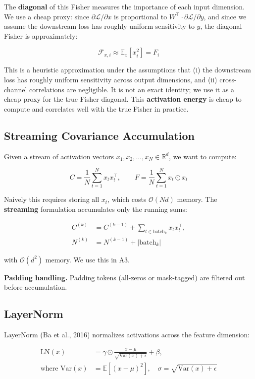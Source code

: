 The \textbf{diagonal} of this Fisher measures the importance of each input 
dimension. We use a cheap proxy: since $\partial \mathcal{L} / \partial x$ is 
proportional to $W^\top \cdot \partial \mathcal{L} / \partial y$, and since 
we assume the downstream loss has roughly uniform sensitivity to $y$, the 
diagonal Fisher is approximately:

\[
\mathcal{F}_{x, i} \approx \mathbb{E}_{x}\!\left[x_i^2\right] = F_i
\tag{3.6}
\]

This is a heuristic approximation under the assumptions that (i) the downstream loss has roughly uniform sensitivity across output dimensions, and (ii) cross-channel correlations are negligible. It is not an exact identity; we use it as a cheap proxy for the true Fisher diagonal. This \textbf{activation energy} is cheap to compute and correlates well with the true Fisher in practice.

\subsection{Streaming Covariance Accumulation}

Given a stream of activation vectors $x_1, x_2, \dots, x_N \in \mathbb{R}^d$, 
we want to compute:

\[
C = \frac{1}{N} \sum_{t=1}^N x_t x_t^\top, \qquad
F = \frac{1}{N} \sum_{t=1}^N x_t \odot x_t
\tag{3.7}
\]

Naively this requires storing all $x_t$, which costs $\mathcal{O}(Nd)$ memory. 
The \textbf{streaming} formulation accumulates only the running sums:

\begin{align}
C^{(k)} &= C^{(k-1)} + \sum_{t \in \text{batch}_k} x_t x_t^\top, \tag{3.8a} \\
N^{(k)} &= N^{(k-1)} + |\text{batch}_k| \tag{3.8b}
\end{align}

with $\mathcal{O}(d^2)$ memory. We use this in A3.

\textbf{Padding handling.} Padding tokens (all-zeros or mask-tagged) are filtered 
out before accumulation.

\subsection{LayerNorm}

LayerNorm (Ba et al., 2016) normalizes activations across the feature 
dimension:

\begin{align}
\text{LN}(x) &= \gamma \odot \frac{x - \mu}{\sqrt{\mathrm{Var}(x) + \epsilon}} + \beta, \tag{3.9a} \\
\text{where } \mathrm{Var}(x) &= \mathbb{E}[(x - \mu)^2], \quad \sigma = \sqrt{\mathrm{Var}(x) + \epsilon} \tag{3.9b}
\end{align}


